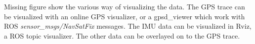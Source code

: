 Missing figure show the various way of visualizing the data.
The GPS trace can be visualized with an online GPS visualizer, or a gpsd\_viewer which work with ROS \textit{sensor\_msgs/NavSatFix} messages.
The IMU data can be visualized in Rviz, a ROS topic visualizer.
The other data can be overlayed on to the GPS trace.
